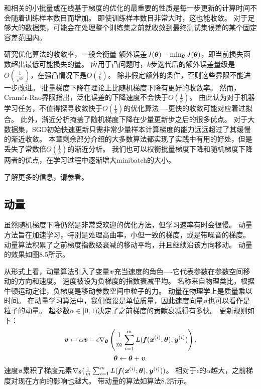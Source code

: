 和相关的小批量或在线基于梯度的优化的最重要的性质是每一步更新的计算时间不会随着训练样本数目而增加。
即使训练样本数目非常大时，这也能收敛。
对于足够大的数据集，可能会在处理整个训练集之前就收敛到最终测试集误差的某个固定容差范围内。

研究优化算法的收敛率，一般会衡量 额外误差$J(\boldsymbol{\theta}) - \min_{\boldsymbol{\theta}} J(\boldsymbol{\theta})$，即当前损失函数超出最低可能损失的量。
应用于凸问题时，$k$步迭代后的额外误差量级是$O(\frac{1}{\sqrt{k}})$，在强凸情况下是$O(\frac{1}{k})$。
除非假定额外的条件，否则这些界限不能进一步改进。
批量梯度下降在理论上比随机梯度下降有更好的收敛率。
然而，Cram\'er-Rao界限\citep{Cramer-1946,Rao-1945}指出，泛化误差的下降速度不会快于$O(\frac{1}{k})$。
\cite{bottou-bousquet-2008-small}由此认为对于机器学习任务，不值得探寻收敛快于$O(\frac{1}{k})$的优化算法----更快的收敛可能对应着过拟合。
此外，渐近分析掩盖了随机梯度下降在少量更新步之后的很多优点。
对于大数据集，SGD初始快速更新只需非常少量样本计算梯度的能力远远超过了其缓慢的渐近收敛。
本章剩余部分介绍的大多数算法都实现了实践中有用的好处，但是丢失了常数倍$O(\frac{1}{k})$的渐近分析。
我们也可以权衡批量梯度下降和随机梯度下降两者的优点，在学习过程中逐渐增大\gls{minibatch}的大小。


了解更多的信息，请参看\cite{Bottou98}。

\subsection{动量}
\label{sec:momentum}
虽然随机梯度下降仍然是非常受欢迎的优化方法，但学习速率有时会很慢。
动量方法\citep{polyak1964some}旨在加速学习，特别是处理高曲率，小但一致的梯度，或是带噪音的梯度。
动量算法积累了之前梯度指数级衰减的移动平均，并且继续沿该方向移动。
动量的效果如图8.5所示。

从形式上看，动量算法引入了变量$\boldsymbol{\mathit{v}}$充当速度的角色----它代表参数在参数空间移动的方向和速度。
速度被设为负梯度的指数衰减平均。
名称来自物理类比，根据牛顿运动定律，负梯度是移动参数空间中粒子的力。
动量在物理学上是质量乘以时间。
在动量学习算法中，我们假设是单位质量，因此速度向量$\boldsymbol{\mathit{v}}$也可以看作是粒子的动量。
超参数$\alpha\in[0,1)$决定了之前梯度的贡献衰减得有多快。
更新规则如下：
\begin{equation}
\boldsymbol{\mathit{v}} \leftarrow \alpha \boldsymbol{\mathit{v}} - \epsilon \nabla_{\boldsymbol{\theta}} \left( \frac{1}{m} \sum_{i=1}^m  L(\boldsymbol{\mathit{f}}(\boldsymbol{\mathit{x}}^{(i)}; \boldsymbol{\theta}), \boldsymbol{\mathit{y}}^{(i)}   )  \right),
\end{equation}
\begin{equation}
\boldsymbol{\theta} \leftarrow \boldsymbol{\theta}  + \boldsymbol{\mathit{v}} .
\end{equation}
速度$\boldsymbol{\mathit{v}}$累积了梯度元素$\nabla_{\boldsymbol{\theta}}( \frac{1}{m} \sum_{i=1}^m L( \boldsymbol{\mathit{f}}(\boldsymbol{\mathit{x}}^{(i)}; \boldsymbol{\theta}), \boldsymbol{\mathit{y}}^{(i)} )  )$。
相对于$\epsilon$的$\alpha$越大，之前梯度对现在方向的影响也越大。
带动量的算法如算法8.2所示。


